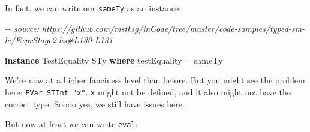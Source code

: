 \documentclass[]{article}
\newenvironment{Shaded}{}{}
\newcommand{\CommentTok}[1]{\textcolor[rgb]{0.38,0.63,0.69}{\textit{#1}}}
\newcommand{\DataTypeTok}[1]{\textcolor[rgb]{0.56,0.13,0.00}{#1}}
\newcommand{\KeywordTok}[1]{\textcolor[rgb]{0.00,0.44,0.13}{\textbf{#1}}}
\newcommand{\NormalTok}[1]{#1}
\newcommand{\OtherTok}[1]{\textcolor[rgb]{0.00,0.44,0.13}{#1}}
\begin{document}
In fact, we can write our \texttt{sameTy} as an instance:

\begin{Shaded}
\begin{Highlighting}[]
\CommentTok{{-}{-} source: https://github.com/mstksg/inCode/tree/master/code{-}samples/typed{-}sm{-}lc/ExprStage2.hs\#L130{-}L131}

\KeywordTok{instance} \DataTypeTok{TestEquality} \DataTypeTok{STy} \KeywordTok{where}
\NormalTok{  testEquality }\OtherTok{=}\NormalTok{ sameTy}
\end{Highlighting}
\end{Shaded}

We're now at a higher fanciness level than before. But you might see the problem
here: \texttt{EVar\ STInt\ "x"}. \texttt{x} might not be defined, and it also
might not have the correct type. Soooo yes, we still have issues here.

But now at least we can write \texttt{eval}:
\end{document}
